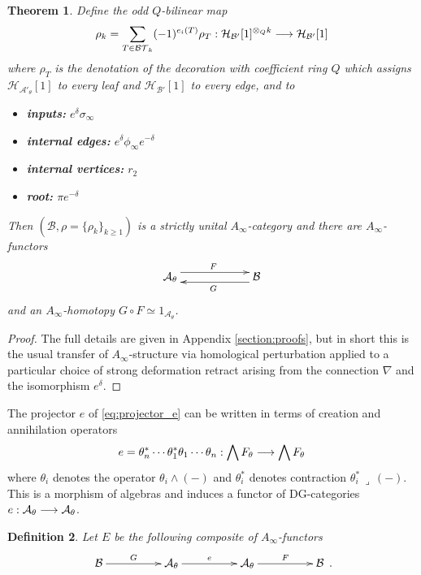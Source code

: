 \documentclass[english,letter paper,12pt,leqno]{article}
\newtheorem{theorem}{Theorem}[section]
\theoremstyle{example}
\newtheorem{definition}[theorem]{Definition}
\numberwithin{equation}{section}
\def\AA{\mathcal{A}}
\def\BB{\mathcal{B}}
\def\HH{\HH}
\def\HH{\mathcal{H}}
\def\be{\begin{equation}}
\def\ee{\end{equation}}
\begin{document}
\begin{theorem}\label{theorem:main_ainfty_products} Define the odd $Q$-bilinear map
\be\label{eq:rho_kintermsoftrees}
\rho_k = \sum_{T \in \cat{BT}_k} (-1)^{e_i(T)} \rho_T : \HH_{\BB'}[1]^{\otimes_Q k} \lto \HH_{\BB'}[1]
\ee
where $\rho_T$ is the denotation of the decoration with coefficient ring $Q$ which assigns $\HH_{\AA'_\theta}[1]$ to every leaf and $\HH_{\BB'}[1]$ to every edge, and to
\begin{center}
\begin{itemize}
\item \textbf{inputs:} $e^\delta \sigma_\infty$
\item \textbf{internal edges:} $e^\delta \phi_\infty e^{-\delta}$
\item \textbf{internal vertices:} $r_2$
\item \textbf{root:} $\pi e^{-\delta}$
\end{itemize}
\end{center}
Then $( \BB, \rho = \{ \rho_k \}_{k \ge 1} )$ is a strictly unital $A_\infty$-category and there are $A_\infty$-functors
\[
\xymatrix@C+3pc{
\AA_\theta \ar@<1ex>[r]^F & \BB \ar@<1ex>[l]^G
}
\]
and an $A_\infty$-homotopy $G \circ F \simeq 1_{\AA_{\theta}}$. %
\end{theorem}
\begin{proof}
The full details are given in Appendix \ref{section:proofs}, but in short this is the usual transfer of $A_\infty$-structure via homological perturbation applied to a particular choice of strong deformation retract arising from the connection $\nabla$ and the isomorphism $e^{\delta}$.
\end{proof}

The projector $e$ of \eqref{eq:projector_e} can be written in terms of creation and annihilation operators
\[
e = \theta_n^* \cdots \theta_1^* \theta_1 \cdots \theta_n: \bigwedge F_\theta \longrightarrow \bigwedge F_\theta
\]
where $\theta_i$ denotes the operator $\theta_i \wedge (-)$ and $\theta_i^*$ denotes contraction $\theta_i^* \,\lrcorner\, (-)$. This is a morphism of algebras and induces a functor of DG-categories $e: \AA_\theta \lto \AA_\theta$.

\begin{definition} Let $E$ be the following composite of $A_\infty$-functors 
\[
\xymatrix@C+2pc{
\BB \ar[r]^-G & \AA_\theta \ar[r]^-{e} & \AA_\theta \ar[r]^-F & \BB
}\,.
\]
\end{definition}
\end{document}
